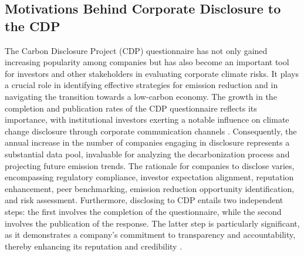 \subsection{Motivations Behind Corporate Disclosure to the CDP}
The Carbon Disclosure Project (CDP) questionnaire has not only gained increasing popularity among companies but has also become an important tool for investors and other stakeholders in evaluating corporate climate risks. It plays a crucial role in identifying effective strategies for emission reduction and in navigating the transition towards a low-carbon economy. The growth in the completion and publication rates of the CDP questionnaire reflects its importance, with institutional investors exerting a notable influence on climate change disclosure through corporate communication channels \cite{Cotter2012Institutional}. Consequently, the annual increase in the number of companies engaging in disclosure represents a substantial data pool, invaluable for analyzing the decarbonization process and projecting future emission trends. The rationale for companies to disclose varies, encompassing regulatory compliance, investor expectation alignment, reputation enhancement, peer benchmarking, emission reduction opportunity identification, and risk assessment. Furthermore, disclosing to CDP entails two independent steps: the first involves the completion of the questionnaire, while the second involves the publication of the response. The latter step is particularly significant, as it demonstrates a company’s commitment to transparency and accountability, thereby enhancing its reputation and credibility \cite{Cotter2012Institutional}.

